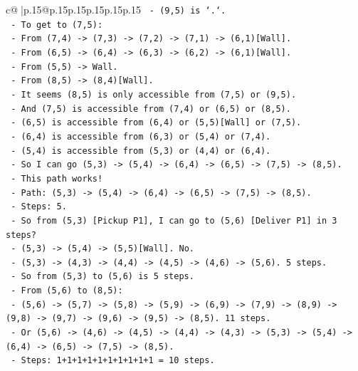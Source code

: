 \documentclass{article}
\begin{document}
{\begin{supertabular}{c@{$\;$}|p{.15\linewidth}@{}p{.15\linewidth}p{.15\linewidth}p{.15\linewidth}p{.15\linewidth}p{.15\linewidth}}
{{{\texttt{      {-} (9,5) is `.`.} \\
\texttt{      {-} To get to (7,5):} \\
\texttt{        {-} From (7,4) {-}> (7,3) {-}> (7,2) {-}> (7,1) {-}> (6,1){[}Wall{]}.} \\
\texttt{        {-} From (6,5) {-}> (6,4) {-}> (6,3) {-}> (6,2) {-}> (6,1){[}Wall{]}.} \\
\texttt{        {-} From (5,5) {-}> Wall.} \\
\texttt{        {-} From (8,5) {-}> (8,4){[}Wall{]}.} \\
\texttt{      {-} It seems (8,5) is only accessible from (7,5) or (9,5).} \\
\texttt{      {-} And (7,5) is accessible from (7,4) or (6,5) or (8,5).} \\
\texttt{      {-} (6,5) is accessible from (6,4) or (5,5){[}Wall{]} or (7,5).} \\
\texttt{      {-} (6,4) is accessible from (6,3) or (5,4) or (7,4).} \\
\texttt{      {-} (5,4) is accessible from (5,3) or (4,4) or (6,4).} \\
\texttt{      {-} So I can go (5,3) {-}> (5,4) {-}> (6,4) {-}> (6,5) {-}> (7,5) {-}> (8,5).} \\
\texttt{      {-} This path works!} \\
\texttt{      {-} Path: (5,3) {-}> (5,4) {-}> (6,4) {-}> (6,5) {-}> (7,5) {-}> (8,5).} \\
\texttt{      {-} Steps: 5.} \\
\texttt{      {-} So from (5,3) {[}Pickup P1{]}, I can go to (5,6) {[}Deliver P1{]} in 3 steps?} \\
\texttt{        {-} (5,3) {-}> (5,4) {-}> (5,5){[}Wall{]}. No.} \\
\texttt{        {-} (5,3) {-}> (4,3) {-}> (4,4) {-}> (4,5) {-}> (4,6) {-}> (5,6). 5 steps.} \\
\texttt{      {-} So from (5,3) to (5,6) is 5 steps.} \\
\texttt{      {-} From (5,6) to (8,5):} \\
\texttt{        {-} (5,6) {-}> (5,7) {-}> (5,8) {-}> (5,9) {-}> (6,9) {-}> (7,9) {-}> (8,9) {-}> (9,8) {-}> (9,7) {-}> (9,6) {-}> (9,5) {-}> (8,5). 11 steps.} \\
\texttt{        {-} Or (5,6) {-}> (4,6) {-}> (4,5) {-}> (4,4) {-}> (4,3) {-}> (5,3) {-}> (5,4) {-}> (6,4) {-}> (6,5) {-}> (7,5) {-}> (8,5).} \\
\texttt{        {-} Steps: 1+1+1+1+1+1+1+1+1+1 = 10 steps.} \\
}}}
\end{supertabular}}
\end{document}
